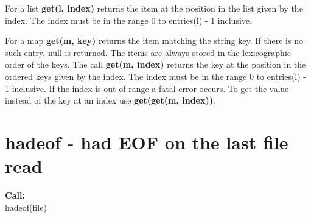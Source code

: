         For a list {\bf get(l, index)} returns the item at the position in
        the list given by the index. The index must be in the range 0 to
        entries(l) - 1 inclusive.
        
        For a map {\bf get(m, key)} returns the item matching the string key.
        If there is no such entry, null is returned.
        The items are always stored in the lexicographic order of the keys. The
        call {\bf get(m, index)} returns the key at the position in the ordered
        keys given by the index. The index must be in the range 0 to entries(l)
        - 1 inclusive. If the index is out of range a fatal error occurs. To get
        the value instead of the key at an index use {\bf get(get(m, index))}.



%        
%        
%        
%        
%
%        


    \section{hadeof - had EOF on the last file read}\label{sec:ifhadeof}
        
        {\bf Call:} \\
        hadeof(file)
        
